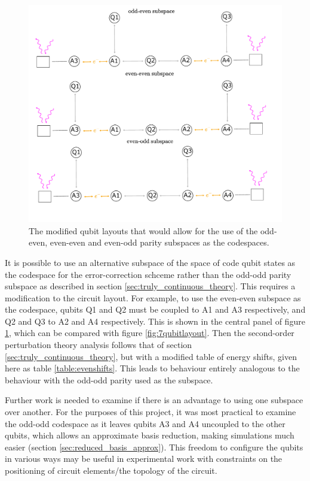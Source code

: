 \documentclass{report}
\begin{document}
\begin{appendices}
\begin{figure}[ht]
    \centering
    \includegraphics[scale = 0.9]{Figures/different_codespaces.pdf}
    \caption{The modified qubit layouts that would allow for the use of the odd-even, even-even and even-odd parity subspaces as the codespaces.}
    \label{fig:differentcodespaces}
\end{figure}
It is possible to use an alternative subspace of the space of code qubit states as the codespace for the error-correction schceme rather than the odd-odd parity subspace as described in section \ref{sec:truly_continuous_theory}. This requires a modification to the circuit layout. For example, to use the even-even subspace as the codespace, qubits Q1 and Q2 must be coupled to A1 and A3 respectively, and Q2 and Q3 to A2 and A4 respectively. This is shown in the central panel of figure \ref{fig:differentcodespaces}, which can be compared with figure \ref{fig:7qubitlayout}. Then the second-order perturbation theory analysis follows that of section \ref{sec:truly_continuous_theory}, but with a modified table of energy shifts, given here as table \ref{table:evenshifts}. This leads to behaviour entirely analogous to the behaviour with the odd-odd parity used as the subspace.

Further work is needed to examine if there is an advantage to using one subspace over another. For the purposes of this project, it was most practical to examine the odd-odd codespace as it leaves qubits A3 and A4 uncoupled to the other qubits, which allows an approximate basis reduction, making simulations much easier (section \ref{sec:reduced_basis_approx}). This freedom to configure the qubits in various ways may be useful in experimental work with constraints on the positioning of circuit elements/the topology of the circuit.


\end{appendices}
\end{document}
